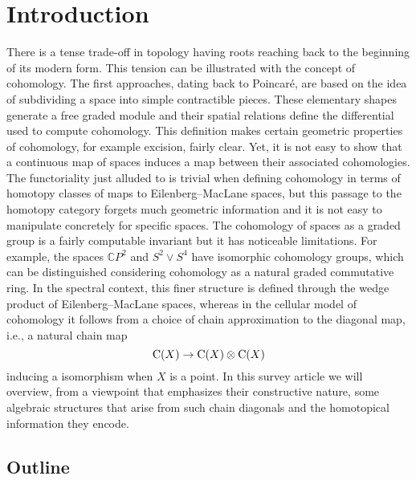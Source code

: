 
\section{Introduction} \label{s:introduction}

There is a tense trade-off in topology having roots reaching back to the beginning of its modern form.
This tension can be illustrated with the concept of cohomology.
The first approaches, dating back to Poincar\'e, are based on the idea of subdividing a space into simple contractible pieces.
These elementary shapes generate a free graded module and their spatial relations define the differential used to compute cohomology.
This definition makes certain geometric properties of cohomology, for example excision, fairly clear.
Yet, it is not easy to show that a continuous map of spaces induces a map between their associated cohomologies.
The functoriality just alluded to is trivial when defining cohomology in terms of homotopy classes of maps to Eilenberg--MacLane spaces, but this passage to the homotopy category forgets much geometric information and it is not easy to manipulate concretely for specific spaces.
The cohomology of spaces as a graded group is a fairly computable invariant but it has noticeable limitations.
For example, the spaces $\mathbb{C} P^2$ and $S^2 \vee S^4$ have isomorphic cohomology groups, which can be distinguished considering cohomology as a natural graded commutative ring.
In the spectral context, this finer structure is defined through the wedge product of Eilenberg--MacLane spaces, whereas in the cellular model of cohomology it follows from a choice of chain approximation to the diagonal map, i.e., a natural chain map
\[
\operatorname{C}(X) \to \operatorname{C}(X) \otimes \operatorname{C}(X)
\]
inducing a isomorphism when $X$ is a point.
In this survey article we will overview, from a viewpoint that emphasizes their constructive nature, some algebraic structures that arise from such chain diagonals and the homotopical information they encode.

\subsection*{Outline}


